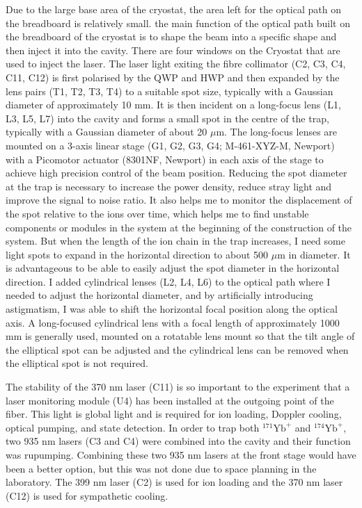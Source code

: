 Due to the large base area of the cryostat, the area left for the optical path on the breadboard is relatively small. the main function of the optical path built on the breadboard of the cryostat is to shape the beam into a specific shape and then inject it into the cavity. There are four windows on the Cryostat that are used to inject the laser. The laser light exiting the fibre collimator (C2, C3, C4, C11, C12) is first polarised by the QWP and HWP and then expanded by the lens pairs (T1, T2, T3, T4) to a suitable spot size, typically with a Gaussian diameter of approximately 10 mm. It is then incident on a long-focus lens (L1, L3, L5, L7) into the cavity and forms a small spot in the centre of the trap, typically with a Gaussian diameter of about 20 $\mu$m. The long-focus lenses are mounted on a 3-axis linear stage (G1, G2, G3, G4; M-461-XYZ-M, Newport) with a Picomotor actuator (8301NF, Newport) in each axis of the stage to achieve high precision control of the beam position. Reducing the spot diameter at the trap is necessary to increase the power density, reduce stray light and improve the signal to noise ratio. It also helps me to monitor the displacement of the spot relative to the ions over time, which helps me to find unstable components or modules in the system at the beginning of the construction of the system. But when the length of the ion chain in the trap increases, I need some light spots to expand in the horizontal direction to about 500 $\mu$m in diameter. It is advantageous to be able to easily adjust the spot diameter in the horizontal direction. I added cylindrical lenses (L2, L4, L6) to the optical path where I needed to adjust the horizontal diameter, and by artificially introducing astigmatism, I was able to shift the horizontal focal position along the optical axis. A long-focused cylindrical lens with a focal length of approximately 1000 mm is generally used, mounted on a rotatable lens mount so that the tilt angle of the elliptical spot can be adjusted and the cylindrical lens can be removed when the elliptical spot is not required.

The stability of the 370 nm laser (C11) is so important to the experiment that a laser monitoring module (U4) has been installed at the outgoing point of the fiber. This light is global light and is required for ion loading, Doppler cooling, optical pumping, and state detection. In order to trap both ${ }^{171} \mathrm{Yb}^{+}$ and ${ }^{174} \mathrm{Yb}^{+}$, two 935 nm lasers (C3 and C4) were combined into the cavity and their function was rupumping. Combining these two 935 nm lasers at the front stage would have been a better option, but this was not done due to space planning in the laboratory. The 399 nm laser (C2) is used for ion loading and the 370 nm laser (C12) is used for sympathetic cooling.

